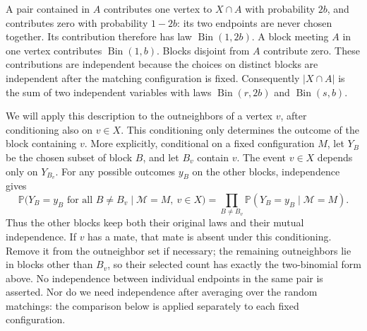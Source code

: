 \documentclass[10pt,a4paper]{article}
\DeclareMathOperator{\Bin}{Bin}
\newcommand{\Pp}{\mathbb P}
\newcommand{\abs}[1]{|#1|}
\begin{document}
A pair contained in \(A\) contributes one vertex to \(X\cap A\) with probability \(2b\), and contributes zero with probability \(1-2b\): its two endpoints are never chosen together. Its contribution therefore has law \(\Bin(1,2b)\). A block meeting \(A\) in one vertex contributes \(\Bin(1,b)\). Blocks disjoint from \(A\) contribute zero. These contributions are independent because the choices on distinct blocks are independent after the matching configuration is fixed. Consequently \(\abs{X\cap A}\) is the sum of two independent variables with laws \(\Bin(r,2b)\) and \(\Bin(s,b)\).

We will apply this description to the outneighbors of a vertex \(v\), after conditioning also on \(v\in X\). This conditioning only determines the outcome of the block containing \(v\). More explicitly, conditional on a fixed configuration \(M\), let \(Y_B\) be the chosen subset of block \(B\), and let \(B_v\) contain \(v\). The event \(v\in X\) depends only on \(Y_{B_v}\). For any possible outcomes \(y_B\) on the other blocks, independence gives
\[
\Pp\bigl(Y_B=y_B\text{ for all }B\ne B_v\mid\mathcal M=M,\ v\in X\bigr)
=\prod_{B\ne B_v}\Pp(Y_B=y_B\mid\mathcal M=M).
\]
Thus the other blocks keep both their original laws and their mutual independence. If \(v\) has a mate, that mate is absent under this conditioning. Remove it from the outneighbor set if necessary; the remaining outneighbors lie in blocks other than \(B_v\), so their selected count has exactly the two-binomial form above. No independence between individual endpoints in the same pair is asserted. Nor do we need independence after averaging over the random matchings: the comparison below is applied separately to each fixed configuration.
\end{document}
